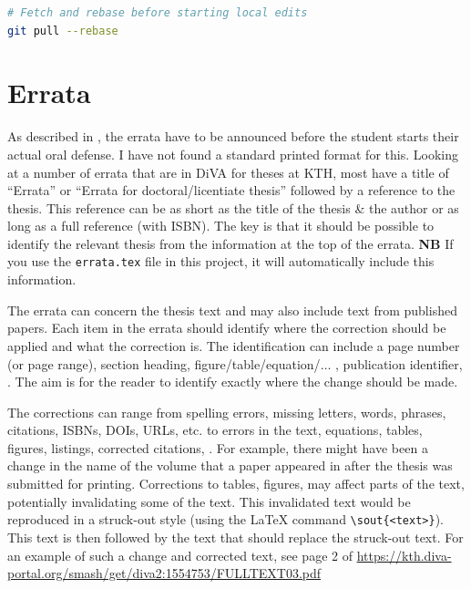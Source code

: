 \documentclass[12pt, twoside]{article}
\newcommand{\fname}[1]{\texttt{#1}}
\begin{document}
\begin{lstlisting}[language=bash]
# Fetch and rebase before starting local edits
git pull --rebase
\end{lstlisting}

\section{Errata}
\label{sec:cycle3Errata}

As described in , the errata have to be announced before the student starts their actual oral defense. I have not found a standard printed format for this. Looking at a number of errata that are in \gls{DiVA} for theses at \gls{KTH}, most have a title of \enquote{Errata} or \enquote{Errata for doctoral/licentiate thesis} followed by a reference to the thesis. This reference can be as short as the title of the thesis \& the author or as long as a full reference (with ISBN). The key is that it should be possible to identify the relevant thesis from the information at the top of the errata. \textbf{NB} If you use the \fname{errata.tex} file in this project, it will automatically include this information.

The errata can concern the thesis text and may also include text from published papers. Each item in the errata should identify where the correction should be applied and what the correction is. The identification can include a page number (or page range), section heading, figure/table/equation/$\ldots$ , publication identifier, \etc. The aim is for the reader to identify exactly where the change should be made.

The corrections can range from spelling errors, missing letters, words, phrases, citations, \glspl{ISBN}, \glspl{DOI}, \glspl{URL}, etc. to errors in the text, equations, tables, figures, listings, corrected citations, \etc. For example, there might have been a change in the name of the volume that a paper appeared in after the thesis was submitted for printing. Corrections to tables, figures, \etc may affect parts of the text, potentially invalidating some of the text. This invalidated text would be reproduced in a struck-out style (using the \LaTeX{} command
\texttt{\textbackslash sout\{<text>\}}). This text is then followed by the text that should replace the struck-out text. For an example of such a change and corrected text, see page 2 of \url{https://kth.diva-portal.org/smash/get/diva2:1554753/FULLTEXT03.pdf}
\end{document}
